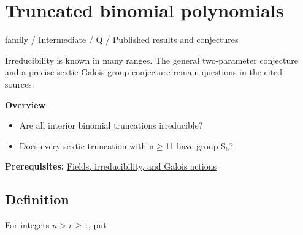 \documentclass[11pt,a4paper,oneside,openany]{book}
\begin{document}
\chapter{Truncated binomial polynomials}\label{article:truncated-binomial}\hypertarget{article:truncated-binomial}{}\color{black}
{\sffamily\small\color{atlasgold}family / Intermediate / Q / Published results and conjectures}\par\medskip
Irreducibility is known in many ranges. The general two-parameter conjecture and a precise sextic Galois-group conjecture remain questions in the cited sources.\par\medskip
\textbf{Overview}\begin{itemize}
\item Are all interior binomial truncations irreducible?
\item Does every sextic truncation with n\ensuremath{\ge}11 have group S\ensuremath{{}_6}?
\end{itemize}
{\small\textbf{Prerequisites:} \hyperlink{article:foundations}{Fields, irreducibility, and Galois actions}}\par
{}\section{Definition}
\color{black} For integers \(n>r\ge1\), put\par
\end{document}
